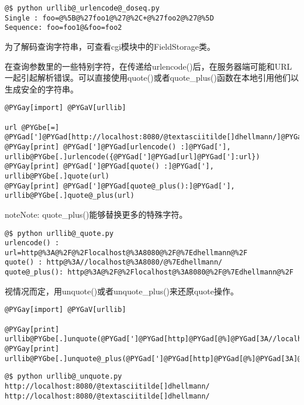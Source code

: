 \documentclass[a4paper,10pt,english]{manual}
\begin{document}
\begin{Verbatim}[commandchars=@\[\]]
@$ python urllib@_urlencode@_doseq.py
Single : foo=@%5B@%27foo1@%27@%2C+@%27foo2@%27@%5D
Sequence: foo=foo1@&foo=foo2
\end{Verbatim}

为了解码查询字符串，可查看cgi模块中的FieldStorage类。

在查询参数里的一些特别字符，在传递给urlencode()后，在服务器端可能和URL一起引起解析错误。可以直接使用quote()或者quote\_plus()函数在本地引用他们以生成安全的字符串。

\begin{Verbatim}[commandchars=@\[\]]
@PYGay[import] @PYGaV[urllib]

url @PYGbe[=] @PYGad[']@PYGad[http://localhost:8080/@textasciitilde[]dhellmann/]@PYGad[']
@PYGay[print] @PYGad[']@PYGad[urlencode() :]@PYGad['], urllib@PYGbe[.]urlencode({@PYGad[']@PYGad[url]@PYGad[']:url})
@PYGay[print] @PYGad[']@PYGad[quote() :]@PYGad['], urllib@PYGbe[.]quote(url)
@PYGay[print] @PYGad[']@PYGad[quote@_plus():]@PYGad['], urllib@PYGbe[.]quote@_plus(url)
\end{Verbatim}

\begin{notice}{note}{Note:}
quote\_plus()能够替换更多的特殊字符。
\end{notice}

\begin{Verbatim}[commandchars=@\[\]]
@$ python urllib@_quote.py
urlencode() : url=http@%3A@%2F@%2Flocalhost@%3A8080@%2F@%7Edhellmann@%2F
quote() : http@%3A//localhost@%3A8080/@%7Edhellmann/
quote@_plus(): http@%3A@%2F@%2Flocalhost@%3A8080@%2F@%7Edhellmann@%2F
\end{Verbatim}

视情况而定，用unquote()或者unquote\_plus()来还原quote操作。

\begin{Verbatim}[commandchars=@\[\]]
@PYGay[import] @PYGaV[urllib]

@PYGay[print] urllib@PYGbe[.]unquote(@PYGad[']@PYGad[http]@PYGad[@%]@PYGad[3A//localhost]@PYGad[@%]@PYGad[3A8080/]@PYGbf[@%7E]@PYGad[dhellmann/]@PYGad['])
@PYGay[print] urllib@PYGbe[.]unquote@_plus(@PYGad[']@PYGad[http]@PYGad[@%]@PYGad[3A]@PYGbf[@%2F]@PYGbf[@%2F]@PYGad[localhost]@PYGad[@%]@PYGad[3A8080]@PYGbf[@%2F]@PYGbf[@%7E]@PYGad[dhellmann]@PYGbf[@%2F]@PYGad['])
\end{Verbatim}

\begin{Verbatim}[commandchars=@\[\]]
@$ python urllib@_unquote.py
http://localhost:8080/@textasciitilde[]dhellmann/
http://localhost:8080/@textasciitilde[]dhellmann/
\end{Verbatim}
\end{document}
